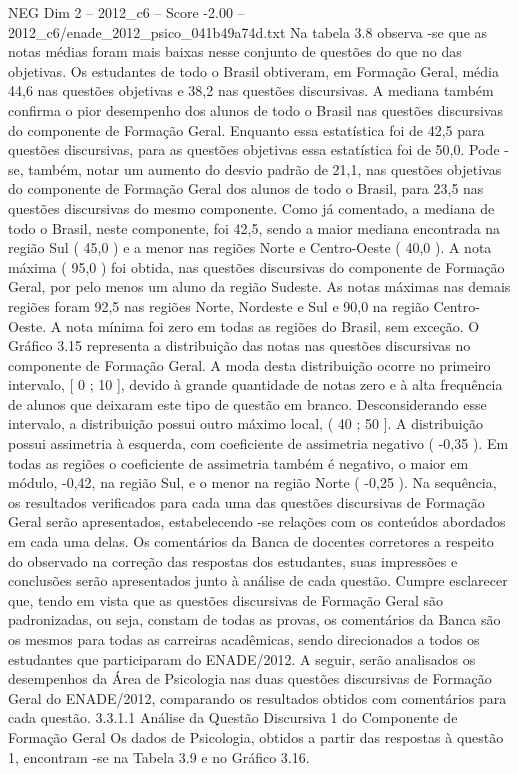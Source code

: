 \begin{textsample}{NEG Dim 2 – 2012\_c6 – Score -2.00 – 2012\_c6/enade\_2012\_psico\_041b49a74d.txt}
Na tabela 3.8 observa -se que as notas médias foram mais baixas nesse conjunto de questões do que no das objetivas.
Os estudantes de todo o Brasil obtiveram, em Formação Geral, média 44,6 nas questões objetivas e 38,2 nas questões discursivas.
A mediana também confirma o pior desempenho dos alunos de todo o Brasil nas questões discursivas do componente de Formação Geral.
Enquanto essa estatística foi de 42,5 para questões discursivas, para as questões objetivas essa estatística foi de 50,0.
Pode -se, também, notar um aumento do desvio padrão de 21,1, nas questões objetivas do componente de Formação Geral dos alunos de todo o Brasil, para 23,5 nas questões discursivas do mesmo componente.
Como já comentado, a mediana de todo o Brasil, neste componente, foi 42,5, sendo a maior mediana encontrada na região Sul ( 45,0 ) e a menor nas regiões Norte e Centro-Oeste ( 40,0 ).
A nota máxima ( 95,0 ) foi obtida, nas questões discursivas do componente de Formação Geral, por pelo menos um aluno da região Sudeste.
As notas máximas nas demais regiões foram 92,5 nas regiões Norte, Nordeste e Sul e 90,0 na região Centro-Oeste.
A nota mínima foi zero em todas as regiões do Brasil, sem exceção.
O Gráfico 3.15 representa a distribuição das notas nas questões discursivas no componente de Formação Geral.
A moda desta distribuição ocorre no primeiro intervalo, [ 0 ; 10 ], devido à grande quantidade de notas zero e à alta frequência de alunos que deixaram este tipo de questão em branco.
Desconsiderando esse intervalo, a distribuição possui outro máximo local, ( 40 ; 50 ].
A distribuição possui assimetria à esquerda, com coeficiente de assimetria negativo ( -0,35 ).
Em todas as regiões o coeficiente de assimetria também é negativo, o maior em módulo, -0,42, na região Sul, e o menor na região Norte ( -0,25 ).
Na sequência, os resultados verificados para cada uma das questões discursivas de Formação Geral serão apresentados, estabelecendo -se relações com os conteúdos abordados em cada uma delas.
Os comentários da Banca de docentes corretores a respeito do observado na correção das respostas dos estudantes, suas impressões e conclusões serão apresentados junto à análise de cada questão.
Cumpre esclarecer que, tendo em vista que as questões discursivas de Formação Geral são padronizadas, ou seja, constam de todas as provas, os comentários da Banca são os mesmos para todas as carreiras acadêmicas, sendo direcionados a todos os estudantes que participaram do ENADE/2012.
A seguir, serão analisados os desempenhos da Área de Psicologia nas duas questões discursivas de Formação Geral do ENADE/2012, comparando os resultados obtidos com comentários para cada questão. 3.3.1.1 Análise da Questão Discursiva 1 do Componente de Formação Geral Os dados de Psicologia, obtidos a partir das respostas à questão 1, encontram -se na Tabela 3.9 e no Gráfico 3.16.

\end{textsample}
